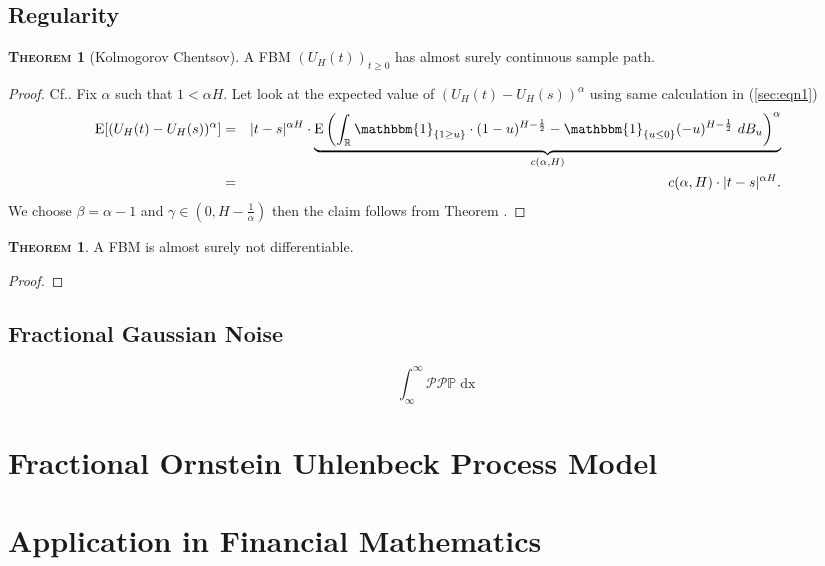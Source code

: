 \documentclass[a4paper, twoside, 11pt]{article}
\theoremstyle{definition}
\newtheorem{theorem}[definition]{\scshape Theorem}
\newcommand{\brkt}[1]{\left({#1} \right)}
\begin{document}
\subsection{Regularity}
\begin{theorem}[Kolmogorov Chentsov]
  A FBM $(U_H(t))_{t\ge 0}$ has almost surely continuous sample path.  
\end{theorem}

\begin{proof}
  Cf.\cite{mandelbrot}. Fix $\alpha$ such that $1 < \alpha H$. Let look at the expected value of $(U_H(t) - U_H(s))^\alpha$ using same calculation in (\ref{sec:eqn1})
  \begin{eqnarray}
	\mathrm{E} [(U_H(t) - U_H(s))^\alpha] &=& |t-s|^{\alpha H} \cdot \underbrace{\mathrm{E}\brkt{\int_{\mathbb{R}} \mathbbm{1}_{\{1\ge u\}}\cdot (1-u)^{H-\frac{1}{2}} - \mathbbm{1}_{\{u\le 0\}} (-u)^{H-\frac{1}{2}} \, \mathop{dB_u}}^\alpha}_{c(\alpha,H)}\nonumber\\
	&=& c(\alpha,H) \cdot |t-s|^{\alpha H}.
	\label{sec:eqn5}
  \end{eqnarray}
  We choose $\beta = \alpha -1$ and $\gamma \in (0, H-\frac{1}{\alpha})$ then the claim follows from Theorem .
\end{proof}

\begin{theorem}
  A FBM is almost surely not differentiable.
\end{theorem}

\begin{proof}

\end{proof}

\subsection{Fractional Gaussian Noise}
\begin{equation}
  \int_{\infty}^{\infty} \mathcal{P} \mathscr{P} \mathbb{P} \mathop{dx}
\end{equation}
\newpage
\section{Fractional Ornstein Uhlenbeck Process Model}
\setcounter{equation}{0}

\newpage

\section{Application in Financial Mathematics}
\end{document}

